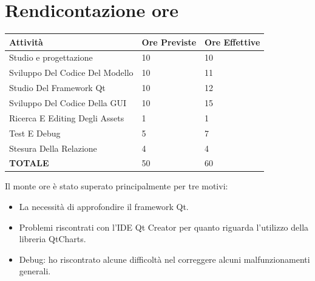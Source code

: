 \documentclass{article}
\begin{document}
    \section{Rendicontazione ore} 

    \begin{table}[!ht]
        \centering
        \begin{tabular}{|l|l|l|}
        \hline
            \textbf{Attività} & \textbf{Ore Previste} & \textbf{Ore Effettive} \\ \hline
            Studio e progettazione & 10 & 10 \\ \hline
            Sviluppo Del Codice Del Modello & 10 & 11 \\ \hline
            Studio Del Framework Qt & 10 & 12 \\ \hline
            Sviluppo Del Codice Della GUI & 10 & 15 \\ \hline
            Ricerca E Editing Degli Assets & 1 & 1 \\ \hline
            Test E Debug & 5 & 7 \\ \hline
            Stesura Della Relazione & 4 & 4 \\ \hline
            \textbf{TOTALE} & 50 & 60 \\ \hline
        \end{tabular}
    \end{table}
    Il monte ore è stato superato principalmente per tre motivi:
    \begin{itemize}
        \item La necessità di approfondire il framework Qt.
        \item Problemi riscontrati con l'IDE Qt Creator per quanto riguarda l'utilizzo della libreria QtCharts.
        \item Debug: ho riscontrato alcune difficoltà nel correggere alcuni malfunzionamenti generali. 
    \end{itemize}
    
\end{document}
